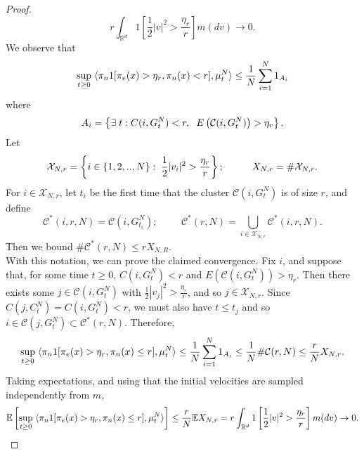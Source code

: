 \begin{proof}
\begin{equation}
    r\int_{\mathbb{R}^d}1\left[\frac{1}{2}|v|^2>\frac{\eta_r}{r}\right]m(dv)\rightarrow 0.
\end{equation}We observe that \begin{equation}
    \sup_{t\geq 0} \hspace{0.1cm} \langle \pi_n 1[\pi_e(x)>\eta_r, \pi_n(x)< r], \mu^N_t\rangle \leq \frac{1}{N}\sum_{i=1}^N 1_{A_i}  
\end{equation} where \begin{equation}
    A_i=\left\{\exists \hspace{0.1cm} t: C(i, G^N_t)< r, \hspace{0.2cm} E\left(\mathcal{C}(i, G^N_t)\right)> \eta_r \right\}.
\end{equation} Let \begin{equation}
    \mathcal{X}_{N,r}=\left\{i \in \{1,2,..,N\}: \hspace{0.1cm} \frac{1}{2}|v_i|^2>\frac{\eta_r}{r}\right\}; \hspace{1cm}X_{N,r}=\#\mathcal{X}_{N,r}.
\end{equation} For $i\in \mathcal{X}_{N,r}$, let $t_{i}$ be the first time that the cluster $\mathcal{C}(i, G^N_t)$ is of size $r$, and define \begin{equation}
    \mathcal{C}^*(i,r,N)=\mathcal{C}(i, G^N_{t_i});\hspace{1cm} \mathcal{C}^*(r,N)=\bigcup_{i\in \mathcal{X}_{N,r}} \mathcal{C}^*(i,r,N).
\end{equation} Then we bound $\#\mathcal{C}^*(r,N)\le r X_{N,R}$.  \medskip \\ With this notation, we can prove the claimed convergence. Fix $i$, and suppose that, for some time $t\geq 0$, $C(i, G^N_t)< r$ and $E(\mathcal{C}(i, G^N_t))> \eta_r.$ Then there exists some $j \in \mathcal{C}(i, G^N_t)$ with $\frac{1}{2}|v_j|^2 >\frac{\eta_r}{r}$, and so $j\in \mathcal{X}_{N,r}$. Since $C(j, C^N_t)=C(i, G^N_t)< r$, we must also have $t\le t_j$ and so $i\in\mathcal{C}(j,G^N_t) \subset \mathcal{C}^*(r,N).$ Therefore, \begin{equation}
    \sup_{t\geq 0} \hspace{0.1cm} \langle \pi_n 1[\pi_e(x)>\eta_r, \pi_n(x)\le r], \mu^N_t\rangle \le \frac{1}{N}\sum_{i=1}^N 1_{A_i} \le \frac{1}{N}\#\mathcal{C}(r,N) \le \frac{r}{N}X_{N,r}.
\end{equation} Taking expectations, and using that the initial velocities are sampled independently from $m$, \begin{equation} \begin{split}
    \mathbb{E}\left[\sup_{t\geq 0} \hspace{0.1cm} \langle \pi_n 1[\pi_e(x)>\eta_r, \pi_n(x)\le r], \mu^N_t\rangle\right] \le \frac{r}{N} \mathbb{E} X_{N,r}  = r\int_{\mathbb{R}^d} 1\left[\frac{1}{2}|v|^2>\frac{\eta_r}{r}\right]m(dv) \rightarrow 0. 
\end{split} \end{equation}\end{proof}
